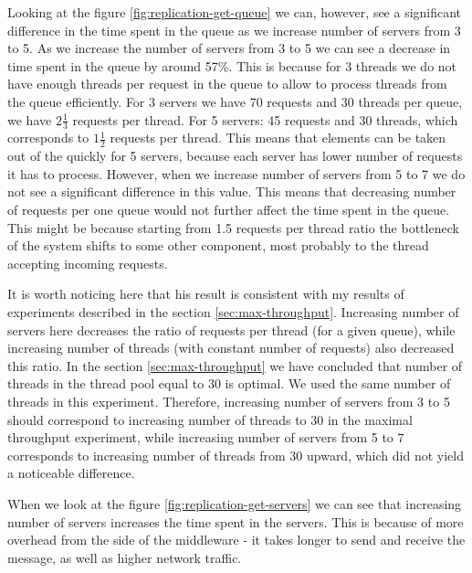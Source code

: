 \documentclass[11pt]{article}
\begin{document}
Looking at the figure \ref{fig:replication-get-queue} we can, however, see a significant difference in the time spent in the queue as we increase number of servers from 3 to 5. As we increase the number of servers from 3 to 5 we can see a decrease in time spent in the queue by around 57\%. This is because for 3 threads we do not have enough threads per request in the queue to allow to process threads from the queue efficiently. For 3 servers we have 70 requests and 30 threads per queue, we have $2\frac{1}{3}$ requests per thread. For 5 servers: 45 requests and 30 threads, which corresponds to $1\frac{1}{2}$ requests per thread. This means that elements can be taken out of the quickly for 5 servers, because each server has lower number of requests it has to process. However, when we increase number of servers from 5 to 7 we do not see a significant difference in this value. This means that decreasing number of requests per one queue would not further affect the time spent in the queue. This might be because starting from 1.5 requests per thread ratio the bottleneck of the system shifts to some other component, most probably to the thread accepting incoming requests.

It is worth noticing here that his result is consistent with my results of experiments described in the section \ref{sec:max-throughput}. Increasing number of servers here decreases the ratio of requests per thread (for a given queue), while increasing number of threads (with constant number of requests) also decreased this ratio. In the section \ref{sec:max-throughput} we have concluded that number of threads in the thread pool equal to 30 is optimal. We used the same number of threads in this experiment. Therefore, increasing number of servers from 3 to 5 should correspond to increasing number of threads to 30 in the maximal throughput experiment, while increasing number of servers from 5 to 7 corresponds to increasing number of threads from 30 upward, which did not yield a noticeable difference.

When we look at the figure \ref{fig:replication-get-servers} we can see that increasing number of servers increases the time spent in the servers. This is because of more overhead from the side of the middleware - it takes longer to send and receive the message, as well as higher network traffic.
\end{document}
